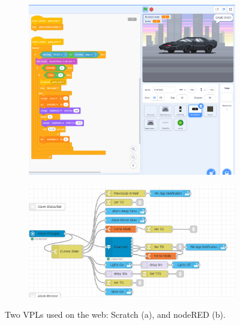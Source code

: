 \begin{figure}
\centering
\begin{subfigure}[b]{0.45\linewidth}
  \graphicspath{{../../assets/images/background/web-vpl/}}
  \centering
  \includegraphics[width=\linewidth]{scratch-2.png}
  \caption{}\label{fig:webvpl:1}
\end{subfigure}%
\qquad 
\begin{subfigure}[b]{0.45\linewidth}
  \graphicspath{{../../assets/images/background/web-vpl/}}
  \centering
  \includegraphics[width=\linewidth]{nodered-2.png}
  \caption{}\label{fig:webvpl:2}
\end{subfigure}%
\caption[web VPLs]{Two VPLs used on the web: Scratch (a), and nodeRED (b). }
\label{fig:webvpl}
\end{figure}

